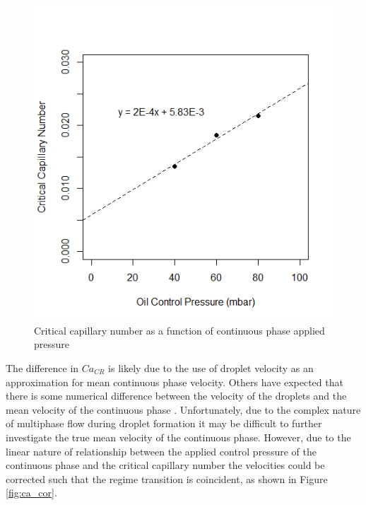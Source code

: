 \begin{figure}[H]
\centering 
\includegraphics[width=0.75\columnwidth]{CrCaABline.PNG} 
\caption[Critical capillary number as a function of continuous phase applied pressure]{Critical capillary number as a function of continuous phase applied pressure} 
\label{fig:CrCaABline} 
\end{figure}

The difference in $Ca_{CR}$ is likely due to the use of droplet velocity as an approximation for mean continuous phase velocity. Others have expected that there is some numerical difference between the velocity of the droplets and the mean velocity of the continuous phase \cite{Ward2005}. Unfortunately, due to the complex nature of multiphase flow during droplet formation it may be difficult to further investigate the true mean velocity of the continuous phase. However, due to the linear nature of relationship between the applied control pressure of the continuous phase and the critical capillary number the velocities could be corrected such that the regime transition is coincident, as shown in Figure \vref{fig:ca_cor}. 

